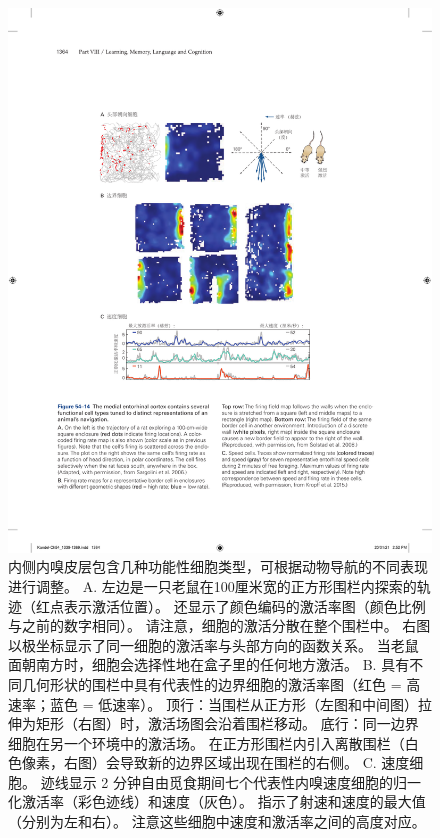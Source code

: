 \begin{figure}[htbp]
	\centering
	\includegraphics[width=0.93\linewidth]{chap54/fig_54_14}
	\caption{内侧内嗅皮层包含几种功能性细胞类型，可根据动物导航的不同表现进行调整。
		A. 左边是一只老鼠在100厘米宽的正方形围栏内探索的轨迹（红点表示激活位置）。
		还显示了颜色编码的激活率图（颜色比例与之前的数字相同）。
		请注意，细胞的激活分散在整个围栏中。
		右图以极坐标显示了同一细胞的激活率与头部方向的函数关系。
		当老鼠面朝南方时，细胞会选择性地在盒子里的任何地方激活\cite{sargolini2006conjunctive}。
		B. 具有不同几何形状的围栏中具有代表性的边界细胞的激活率图（红色 = 高速率；蓝色 = 低速率）。
		顶行：当围栏从正方形（左图和中间图）拉伸为矩形（右图）时，激活场图会沿着围栏移动。
		底行：同一边界细胞在另一个环境中的激活场。
		在正方形围栏内引入离散围栏（白色像素，右图）会导致新的边界区域出现在围栏的右侧\cite{solstad2008representation}。
		C. 速度细胞。
		迹线显示 2 分钟自由觅食期间七个代表性内嗅速度细胞的归一化激活率（彩色迹线）和速度（灰色）。
		指示了射速和速度的最大值（分别为左和右）。
		注意这些细胞中速度和激活率之间的高度对应\cite{kropff2015speed}。}
	\label{fig:54_14}
\end{figure}


